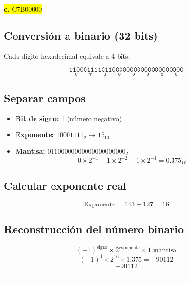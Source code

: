 \documentclass[a4paper,12pt]{article}
\begin{document}
	\begin{center}
		\colorbox{yellow}{\textbf{c.} C7B00000}
		\subsection*{Conversión a binario (32 bits)}
		Cada dígito hexadecimal equivale a 4 bits:
		
		\[
		\mathtt{
			\underset{\text{C}}{\boxed{\mathtt{1100}}}
			\underset{\text{7}}{\boxed{\mathtt{0111}}}
			\underset{\text{B}}{\boxed{\mathtt{1011}}}
			\underset{\text{0}}{\boxed{\mathtt{0000}}}
			\underset{\text{0}}{\boxed{\mathtt{0000}}}
			\underset{\text{0}}{\boxed{\mathtt{0000}}}
			\underset{\text{0}}{\boxed{\mathtt{0000}}}
			\underset{\text{0}}{\boxed{\mathtt{0000}}}
		}	
		\]
		
		\subsection*{Separar campos}
		
		\begin{itemize}
			\item \textbf{Bit de signo:} 1 (número negativo)
			\item \textbf{Exponente:} $10001111_2$ → $15_{10}$
			\item \textbf{Mantisa:} $01100000000000000000000_2$ 
			\[
			0\times2^{-1} + 1\times2^{-2} + 1\times2^{-3} = 0.375_{10}
			\]
		\end{itemize}
		
		\subsection*{Calcular exponente real}
		
		\[
		\text{Exponente} = 143 - 127 = 16
		\]
		
		
		
		\subsection*{Reconstrucción del número binario}	
		\[
		(-1)^{\text{signo}} \times 2^{\text{exponente}} \times 1.\text{mantisa}
		\]
		\[
		(-1)^1 \times 2^16 \times 1.375 = -90112
		\]
		\vspace{1em}
		\[
		\boxed{-90112}
		\]
		
		---
	\end{center}
\end{document}
